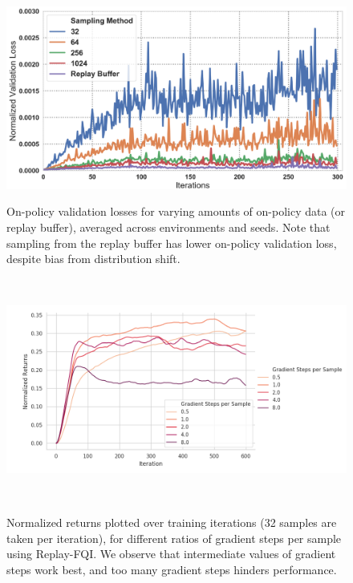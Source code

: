 \begin{figure}[ttt!]
\begin{minipage}[t]{0.32\linewidth}

\includegraphics[width=0.95\columnwidth]{chapters/diagnosing_q/images/overfitting.pdf}
\caption{\label{fig:sampling_validation_loss} On-policy validation losses for varying amounts of on-policy data (or replay buffer), averaged across environments and seeds. Note that sampling from the replay buffer has lower on-policy validation loss, despite bias from distribution shift.}
\end{minipage}
~\vline~
\begin{minipage}[t]{0.32\linewidth}
\includegraphics[trim={0 0 7.0cm 0},clip,width=0.95\columnwidth]{chapters/diagnosing_q/images/grad_steps_fqi}
\caption{\label{fig:fqi_grad_sweep}Normalized returns plotted over training iterations (32 samples are taken per iteration), for different ratios of gradient steps per sample using Replay-FQI. We observe that intermediate values of gradient steps work best, and too many gradient steps hinders performance.}
\end{minipage}
~\vline~
\begin{minipage}[t]{0.32\linewidth}

\end{minipage}
\end{figure}
